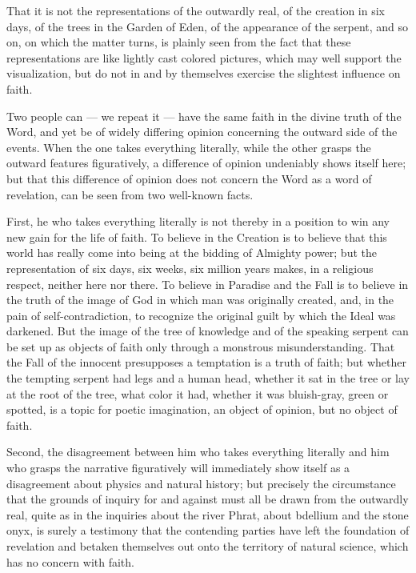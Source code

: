 \documentclass[12pt,a4paper,openany]{book}
\newcommand{\opage}[1]{\marginnote{\footnotesize\textit{[#1]}}}
\begin{document}
That it is not the representations of the outwardly
real, of the creation in six days, of the trees in
the Garden of Eden, of the appearance of the serpent, and so on, on which
the matter turns, is plainly seen from the fact that these representations
are like lightly cast colored pictures, which may well
support the visualization, but do not in and by themselves
exercise the slightest influence on faith.

Two people can --- we repeat it --- have the
same faith in the divine truth of the Word, and yet
be of widely differing opinion concerning the outward side
of the events. When the one takes everything literally,
while the other grasps the outward features figuratively,
a difference of opinion undeniably shows itself here; but that
this difference of opinion does not concern the Word as a word of revelation,
can be seen from two well-known facts.

First, he who takes everything literally
\setcounter{footnote}{0}%
\opage{306}is not thereby in a position to win any new gain
for the life of faith. To believe in the Creation is to believe that this
world has really come into being at the bidding of Almighty power; but
the representation of six days, six weeks, six million
years makes, in a religious respect, neither here nor there. To
believe in Paradise and the Fall is to believe in the truth
of the image of God in which man was originally
created, and, in the pain of self-contradiction, to recognize the
original guilt by which the Ideal was darkened. But
the image of the tree of knowledge and of the speaking serpent can
be set up as objects of faith only through a monstrous misunderstanding.
That the Fall of the innocent presupposes
a temptation is a truth of faith; but whether the tempting
serpent had legs and a human head, whether it
sat in the tree or lay at the root of the tree, what
color it had, whether it was bluish-gray, green
or spotted, is a topic for poetic imagination, an
object of opinion, but no object of faith.

Second, the disagreement between him who takes
everything literally and him who grasps the narrative figuratively
will immediately show itself as a disagreement about
physics and natural history; but precisely the circumstance
that the grounds of inquiry for and against must all be drawn
from the outwardly real, quite as in the inquiries
about the river Phrat, about bdellium and the stone onyx,
is surely a testimony that the contending parties have left
the foundation of revelation and betaken themselves out onto the territory of natural science,
which has no concern with faith.
\end{document}
